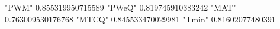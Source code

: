 "PWM" 0.855319950715589
"PWeQ" 0.819745910383242
"MAT" 0.763009530176768
"MTCQ" 0.845533470029981
"Tmin" 0.81602077480391
